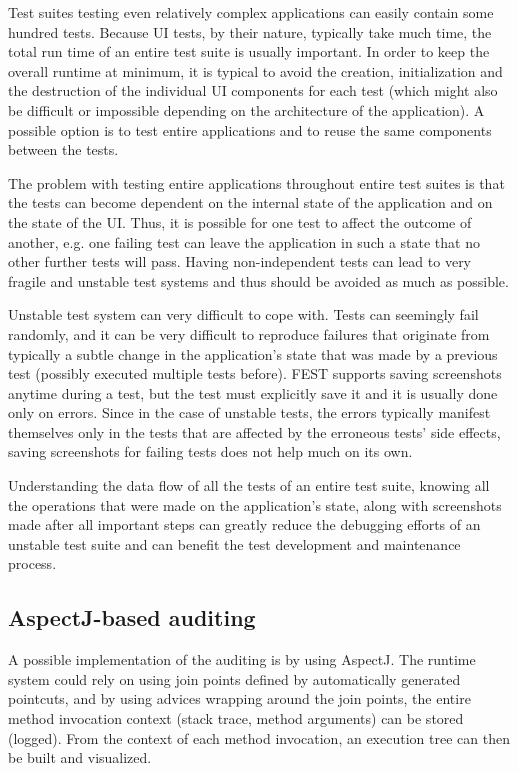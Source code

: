 Test suites testing even relatively complex applications can easily contain some hundred tests. Because UI tests, by their nature, typically take much time, the total run time of an entire test suite is usually important. In order to keep the overall runtime at minimum, it is typical to avoid the creation, initialization and the destruction of the individual UI components for each test (which might also be difficult or impossible depending on the architecture of the application). A possible option is to test entire applications and to reuse the same components between the tests.

The problem with testing entire applications throughout entire test suites is that the tests can become dependent on the internal state of the application and on the state of the UI. Thus, it is possible for one test to affect the outcome of another, e.g. one failing test can leave the application in such a state that no other further tests will pass. Having non-independent tests can lead to very fragile and unstable test systems and thus should be avoided as much as possible.

Unstable test system can very difficult to cope with. Tests can seemingly fail randomly, and it can be very difficult to reproduce failures that originate from typically a subtle change in the application's state that was made by a previous test (possibly executed multiple tests before). FEST supports saving screenshots anytime during a test, but the test must explicitly save it and it is usually done only on errors. Since in the case of unstable tests, the errors typically manifest themselves only in the tests that are affected by the erroneous tests' side effects, saving screenshots for failing tests does not help much on its own.

Understanding the data flow of all the tests of an entire test suite, knowing all the operations that were made on the application's state, along with screenshots made after all important steps can greatly reduce the debugging efforts of an unstable test suite and can benefit the test development and maintenance process.

\subsection {AspectJ-based auditing}

A possible implementation of the auditing is by using AspectJ. The runtime system could rely on using join points defined by automatically generated pointcuts, and by using advices wrapping around the join points, the entire method invocation context (stack trace, method arguments) can be stored (logged). \cite{AOPwiki} From the context of each method invocation, an execution tree can then be built and visualized.

